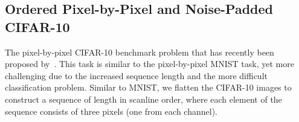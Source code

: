 \documentclass{article} \usepackage{iclr2021_conference,times}
\begin{document}
\begin{table}[!t]
	\caption{Sensitivity to random initialization evaluated over 10 runs.}
	\label{tab:minmax}
	\centering
\end{table}


\subsection{Ordered Pixel-by-Pixel and Noise-Padded CIFAR-10}\label{sec:cifar10}

The pixel-by-pixel CIFAR-10 benchmark problem that has recently been proposed by~\citep{chang2018antisymmetricrnn}. This task is similar to the pixel-by-pixel MNIST task, yet more challenging due to the increased sequence length and the more difficult classification problem.  
Similar to MNIST, we flatten the CIFAR-10 images to construct a sequence of length  in scanline order, where each element of the sequence consists of three pixels (one from each channel).
\end{document}
